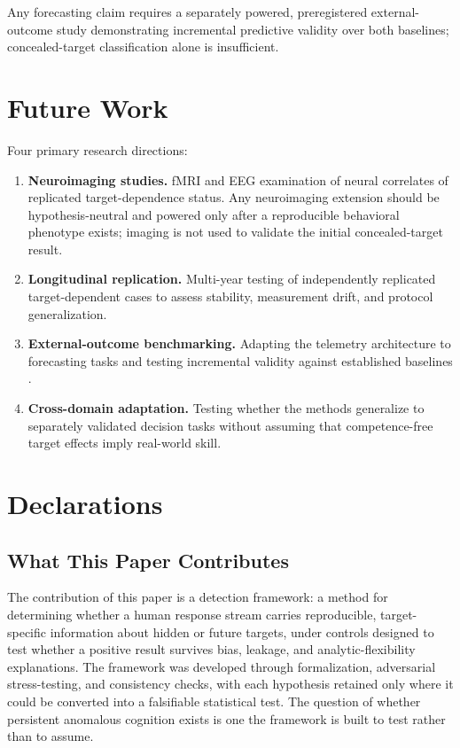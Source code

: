 \documentclass[11pt,letterpaper]{article}
\begin{document}
Any forecasting claim requires a separately powered, preregistered external-outcome study demonstrating incremental predictive validity over both baselines; concealed-target classification alone is insufficient.

\section{Future Work}

Four primary research directions:

\begin{enumerate}
    \item \textbf{Neuroimaging studies.} fMRI and EEG examination of neural correlates of replicated target-dependence status. Any neuroimaging extension should be hypothesis-neutral and powered only after a reproducible behavioral phenotype exists; imaging is not used to validate the initial concealed-target result.
    \item \textbf{Longitudinal replication.} Multi-year testing of independently replicated target-dependent cases to assess stability, measurement drift, and protocol generalization.
    \item \textbf{External-outcome benchmarking.} Adapting the telemetry architecture to forecasting tasks and testing incremental validity against established baselines \cite{tetlock2015}.
    \item \textbf{Cross-domain adaptation.} Testing whether the methods generalize to separately validated decision tasks without assuming that competence-free target effects imply real-world skill.
\end{enumerate}

\section{Declarations}

\subsection{What This Paper Contributes}

The contribution of this paper is a detection framework: a method for determining whether a human response stream carries reproducible, target-specific information about hidden or future targets, under controls designed to test whether a positive result survives bias, leakage, and analytic-flexibility explanations. The framework was developed through formalization, adversarial stress-testing, and consistency checks, with each hypothesis retained only where it could be converted into a falsifiable statistical test. The question of whether persistent anomalous cognition exists is one the framework is built to test rather than to assume.
\end{document}
